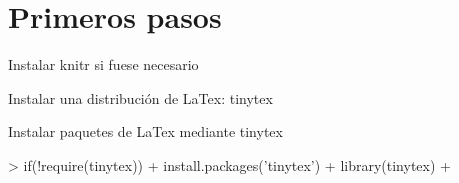 \documentclass{article}
\begin{document}



\section*{Primeros pasos}

\begin{itemsize}
\item Instalar knitr si fuese necesario
\item Instalar una distribución de LaTex: tinytex
\item Instalar paquetes de LaTex mediante tinytex
\end{itemsize}


\begin{Schunk}
\begin{Sinput}
> if(!require(tinytex)){
+   install.packages('tinytex')
+   library(tinytex)
+ }
\end{Sinput}
\end{Schunk}
\end{document}
